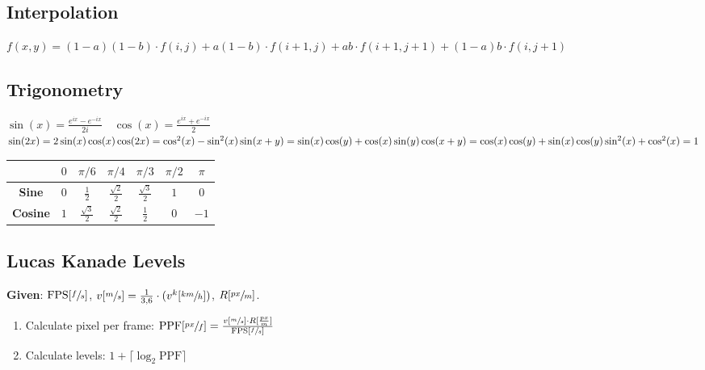 \subsection{Interpolation}

\begin{definition}
  \(f(x,y) = (1-a)(1-b) \cdot f(i,j) + a(1-b) \cdot f(i+1,j) + ab \cdot f(i+1, j+1) + (1-a)b \cdot f(i,j+1)\)
\end{definition}

\subsection{Trigonometry}
\(\sin(x) = \frac{e^{ix} - e^{-ix}}{2i} \quad \cos(x) = \frac{e^{ix} + e^{-ix}}{2}\) \\
\(\sin(2x) = 2\sin(x)\cos(x) \\ \cos(2x) = \cos^2(x) - \sin^2(x) \\ \sin(x+y) = \sin(x)\cos(y) + \cos(x)\sin(y) \\ \cos(x+y) = \cos(x)\cos(y) + \sin(x)\cos(y) \\ \sin^2(x) + \cos^2(x) = 1\)

\begin{center}
  \begin{tabular}{|c|c|c|c|c|c|c|}
  \hline
  & \(0\) & \(\pi/6\) & \(\pi/4\) & \(\pi/3\) & \(\pi/2\) & \(\pi\) \\
  \hline
  \textbf{Sine} & \(0\) & \(\frac{1}{2}\) & \(\frac{\sqrt{2}}{2}\) & \(\frac{\sqrt{3}}{2}\) & \(1\) & \(0\) \\
  \hline
  \textbf{Cosine} & \(1\) & \(\frac{\sqrt{3}}{2}\) & \(\frac{\sqrt{2}}{2}\) & \(\frac{1}{2}\) & \(0\) & \(-1\) \\
  \hline
  \end{tabular}
\end{center}

\subsection{Lucas Kanade Levels}

\textbf{Given}: \(\text{FPS}[\sfrac{f}{s}]\), \(v[\sfrac{m}{s}] = \frac{1}{3,6} \cdot (v^k[\sfrac{km}{h}])\), \(R[\sfrac{px}{m}]\).

\begin{enumerate}
  \item Calculate pixel per frame: \(\text{PPF}[\sfrac{px}{f}] = \frac{v[\sfrac{m}{s}] \cdot R[\frac{px}{m}]}{\text{FPS}[\sfrac{f}{s}]}\)
  \item Calculate levels: \(1 + \lceil \log_2 \text{PPF} \rceil\)
\end{enumerate}

